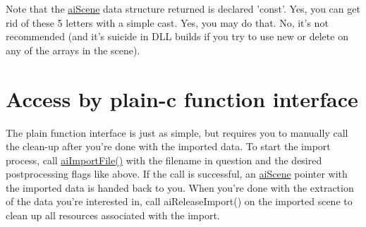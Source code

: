 Note that the \hyperlink{structai_scene}{ai\+Scene} data structure returned is declared 'const'. Yes, you can get rid of these 5 letters with a simple cast. Yes, you may do that. No, it's not recommended (and it's suicide in D\+L\+L builds if you try to use new or delete on any of the arrays in the scene).\hypertarget{usage_access_c}{}\section{Access by plain-\/c function interface}\label{usage_access_c}
The plain function interface is just as simple, but requires you to manually call the clean-\/up after you're done with the imported data. To start the import process, call \hyperlink{_assimp_8cpp_a991846be600bc8a54f6878e5bca96907}{ai\+Import\+File()} with the filename in question and the desired postprocessing flags like above. If the call is successful, an \hyperlink{structai_scene}{ai\+Scene} pointer with the imported data is handed back to you. When you're done with the extraction of the data you're interested in, call ai\+Release\+Import() on the imported scene to clean up all resources associated with the import.

